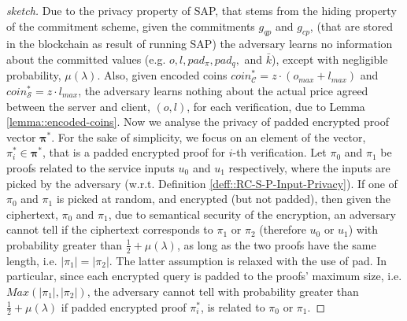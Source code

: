 \begin{proof}[sketch]
Due to the privacy property of SAP, that stems from the  hiding property of the commitment scheme, given the commitments $g_{\scriptscriptstyle qp}$ and $g_{\scriptscriptstyle cp}$, (that are stored in the blockchain as result of running SAP) the adversary learns no information about the committed values (e.g. $o, l, pad_{\scriptscriptstyle\pi}, pad_{\scriptscriptstyle q},$ and $\bar{k}$), except with negligible probability, $\mu(\lambda)$.   Also, given encoded coins $coin^{\scriptscriptstyle *}_{\scriptscriptstyle\mathcal{C}}=z\cdot (o_{\scriptscriptstyle max}+l_{\scriptscriptstyle max})$ and  $coin^{\scriptscriptstyle *}_{\scriptscriptstyle\mathcal{S}}=z\cdot l_{\scriptscriptstyle max}$, the adversary learns nothing about the actual price agreed between the server and client,  $(o,l)$, for each verification, due to Lemma \ref{lemma::encoded-coins}. Now we analyse the privacy of padded encrypted proof vector $\bm{\pi}^{\scriptscriptstyle *}$. For the sake of simplicity, we focus on an element of the vector,  $\pi_{\scriptscriptstyle i}^{\scriptscriptstyle *}\in\bm{\pi}^{\scriptscriptstyle *}$, that is a padded encrypted proof for $i$-th verification. Let $\pi_{\scriptscriptstyle 0}$ and $\pi_{\scriptscriptstyle 1}$ be proofs related to the service inputs $u_{\scriptscriptstyle 0}$ and $u_{\scriptscriptstyle 1}$ respectively, where the inputs   are picked by the adversary (w.r.t. Definition  \ref{deff::RC-S-P-Input-Privacy}). If one of $\pi_{\scriptscriptstyle 0}$ and $\pi_{\scriptscriptstyle 1}$  is picked at random, and   encrypted (but not padded), then given the ciphertext, $\pi_{\scriptscriptstyle 0}$ and $\pi_{\scriptscriptstyle 1}$, due to semantical security of the encryption, an adversary cannot tell if the ciphertext corresponds to $\pi_{\scriptscriptstyle 1}$ or $\pi_{\scriptscriptstyle 2}$  (therefore $u_{\scriptscriptstyle 0}$ or $u_{\scriptscriptstyle 1}$) with probability greater than $\frac{1}{2}+\mu(\lambda)$,  as long as the two proofs have the same length, i.e. $|\pi_{\scriptscriptstyle 1}|=|\pi_{\scriptscriptstyle 2}|$.  The latter assumption is  relaxed with the use of pad. In particular, since each encrypted query is padded  to the proofs' maximum size, i.e. $Max(|\pi_{\scriptscriptstyle 1}|,|\pi_{\scriptscriptstyle 2}|)$, the adversary cannot tell with probability greater than $\frac{1}{2}+\mu(\lambda)$ if  padded encrypted proof $\pi_{\scriptscriptstyle i}^{\scriptscriptstyle *}$, is related to $\pi_{\scriptscriptstyle 0}$ or $\pi_{\scriptscriptstyle 1}$. 











\end{proof}
